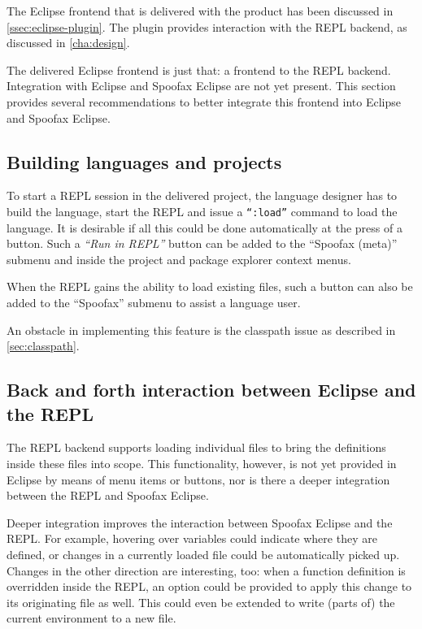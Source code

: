 The Eclipse frontend that is delivered with the product has been discussed in
\cref{ssec:eclipse-plugin}. The plugin provides interaction with the REPL
backend, as discussed in \cref{cha:design}.

The delivered Eclipse frontend is just that: a frontend to the REPL backend.
Integration with Eclipse and Spoofax Eclipse are not yet present. This
section provides several recommendations to better integrate this frontend
into Eclipse and Spoofax Eclipse.

\subsection{Building languages and projects}

To start a REPL session in the delivered project, the language designer has to
build the language, start the REPL and issue a \texttt{``:load''} command to
load the language. It is desirable if all this could be done automatically at
the press of a button. Such a \textit{``Run in REPL''} button can be added to the
``Spoofax (meta)'' submenu and inside the project and package explorer context
menus.

When the REPL gains the ability to load existing files, such a button can also
be added to the ``Spoofax'' submenu to assist a language user.

An obstacle in implementing this feature is the classpath issue as described in
\cref{sec:classpath}.

\subsection{Back and forth interaction between Eclipse and the REPL}

The REPL backend supports loading individual files to bring the definitions
inside these files into scope. This functionality, however, is not yet provided
in Eclipse by means of menu items or buttons, nor is there a deeper integration
between the REPL and Spoofax Eclipse.

Deeper integration improves the interaction between Spoofax Eclipse and the
REPL. For example, hovering over variables could indicate where they are defined, or
changes in a currently loaded file could be automatically picked up. Changes in
the other direction are interesting, too: when a function definition is overridden
inside the REPL, an option could be provided to apply this change to its
originating file as well. This could even be extended to write (parts of) the current
environment to a new file.

